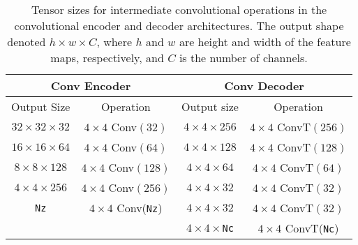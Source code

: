 \documentclass[runningheads]{llncs}
\begin{document}
\begin{table}[ht!]
  \centering
  \begin{tabular}{|c|c|c|c|}
    \hline
    \multicolumn{2}{|c|}{Conv Encoder} & \multicolumn{2}{c|}{Conv Decoder} \\
    \hline
    Output Size & Operation & Output size & Operation \\
    \hline
    \hline
    $32 \times 32 \times 32$ & $4 \times 4$ Conv$(32)$ & $4 \times 4 \times 256$ & $4 \times 4$ ConvT$(256)$ \\
    \hline
    $16 \times 16 \times 64$ & $4 \times 4$ Conv$(64)$ & $4 \times 4 \times 128$ & $4 \times 4$ ConvT$(128)$ \\
    \hline
    $8 \times 8 \times 128$ & $4 \times 4$ Conv$(128)$ & $4 \times 4 \times 64$ &  $4 \times 4$ ConvT$(64)$ \\
    \hline
    $4 \times 4 \times 256$ & $4 \times 4$ Conv$(256)$ & $4 \times 4 \times 32$ &  $4 \times 4$ ConvT$(32)$ \\
    \hline
    \texttt{Nz}             & $4 \times 4$ Conv(\texttt{Nz}) & $4 \times 4 \times 32$ & $4 \times 4$ ConvT$(32)$ \\
    \hline
    & & $4 \times 4 \times $\texttt{Nc} & $4 \times 4$ ConvT(\texttt{Nc}) \\
    \hline
  \end{tabular}
  \caption{Tensor sizes for intermediate convolutional operations in the convolutional encoder and decoder architectures.
  The output shape denoted $h \times w \times C$, where $h$ and $w$ are height and width of the feature maps, respectively, 
  and $C$ is the number of channels.}
  \label{tab:conv_architectures}
\end{table}
\end{document}

